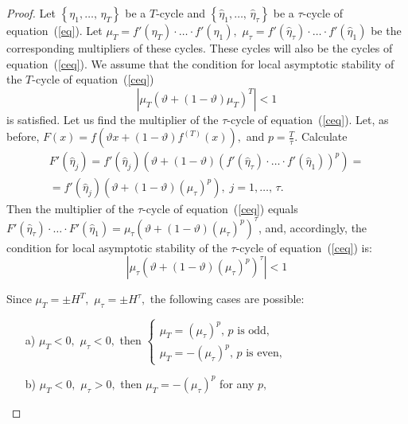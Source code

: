 \documentclass[12pt,a4paper]{amsart}
\begin{document}
\begin{proof}
Let $\left\{\eta_1,\ldots,\,\eta_T\right\}$ be a $T$-cycle and $\left\{\widehat{\eta}_1,\ldots,\,\widehat{\eta}_\tau\right\}$ be a $\tau$-cycle of 
equation~(\ref{eq}). Let $\mu_T = f'(\eta_T)\cdot\ldots\cdot f'(\eta_1),$ $\mu_\tau = f'(\widehat{\eta}_\tau)\cdot\ldots\cdot f'(\widehat{\eta}_1)$ 
be the corresponding multipliers of these cycles. These cycles will also be the cycles of equation~(\ref{ceq}). We assume that the condition for local 
asymptotic stability of the $T$-cycle of equation~(\ref{ceq})
\begin{equation}\label{tc}
\left| \mu_T \left( \vartheta + (1 - \vartheta) \mu_T\right)^T\right| < 1 
\end{equation}
is satisfied. Let us find the multiplier of the $\tau$-cycle of equation~(\ref{ceq}). Let, as before, 
$F(x) = f \left( \vartheta x + (1-\vartheta) f^{(T)}(x)\right),$ and $p=\frac{T}{\tau}.$ Calculate
\begin{gather*}
F'(\widehat{\eta}_j) = f'(\widehat{\eta}_j) \left( \vartheta + (1-\vartheta) \left( f'(\widehat{\eta}_\tau)\cdot\ldots\cdot f'(\widehat{\eta}_1) \right)^p \right) = \\
= f'(\widehat{\eta}_j) \left( \vartheta + (1-\vartheta) (\mu_\tau)^p \right),\; j=1,\ldots,\,\tau.
\end{gather*}
Then the multiplier of the $\tau$-cycle of equation~(\ref{ceq}) equals 
$F'(\widehat{\eta}_\tau)\cdot\ldots\cdot F'(\widehat{\eta}_1) = \mu_\tau \left( \vartheta + (1-\vartheta) (\mu_\tau)^p \right)^\tau$, and, accordingly, 
the condition for local asymptotic stability of the $\tau$-cycle of equation~(\ref{ceq}) is:
\begin{equation}\label{tauc}
\left| \mu_\tau \left( \vartheta + (1 - \vartheta) (\mu_\tau)^p \right)^\tau \right| < 1 
\end{equation}

Since $\mu_T = \pm H^T,$ $\mu_\tau = \pm H^\tau,$ the following cases are possible:

\begin{enumerate}
\item[a)] $\mu_T<0,$ $\mu_\tau<0,$ then 
$\left\{\begin{array}{ll}
\mu_T = (\mu_\tau)^p,\, p \text{ is odd}, \\
\mu_T = -(\mu_\tau)^p,\, p \text{ is even},
\end{array}\right.$

\medskip
\item[b)] $\mu_T<0,$ $\mu_\tau>0,$ then $\mu_T = -(\mu_\tau)^p$ for any $p,$  


\end{enumerate}
\end{proof}
\end{document}
